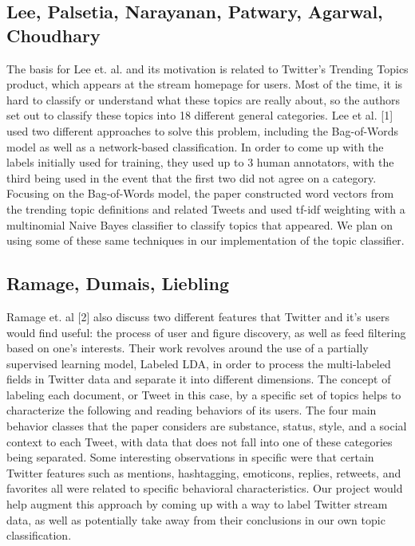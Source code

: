 \documentclass[11pt]{article}
\begin{document}
\subsection{Lee, Palsetia, Narayanan, Patwary, Agarwal, Choudhary}

The basis for Lee et. al. and its motivation is related to Twitter's Trending Topics product, which appears at the stream homepage for users. Most of the time, it is hard to classify or understand what these topics are really about, so the authors set out to classify these topics into 18 different general categories. Lee et al. [1] used two different approaches to solve this problem, including the Bag-of-Words model as well as a network-based classification. In order to come up with the labels initially used for training, they used up to 3 human annotators, with the third being used in the event that the first two did not agree on a category. Focusing on the Bag-of-Words model, the paper constructed word vectors from the trending topic definitions and related Tweets and used tf-idf weighting with a multinomial Naive Bayes classifier to classify topics that appeared. We plan on using some of these same techniques in our implementation of the topic classifier.

\subsection{Ramage, Dumais, Liebling}

Ramage et. al [2] also discuss two different features that Twitter and it's users would find useful: the process of user and figure discovery, as well as feed filtering based on one’s interests. Their work revolves around the use of a partially supervised learning model, Labeled LDA, in order to process the multi-labeled fields in Twitter data and separate it into different dimensions. The concept of labeling each document, or Tweet in this case, by a specific set of topics helps to characterize the following and reading behaviors of its users. The four main behavior classes that the paper considers are substance, status, style, and a social context to each Tweet, with data that does not fall into one of these categories being separated. Some interesting observations in specific were that certain Twitter features such as mentions, hashtagging, emoticons, replies, retweets, and favorites all were related to specific behavioral characteristics. Our project would help augment this approach by coming up with a way to label Twitter stream data, as well as potentially take away from their conclusions in our own topic classification.
\end{document}
